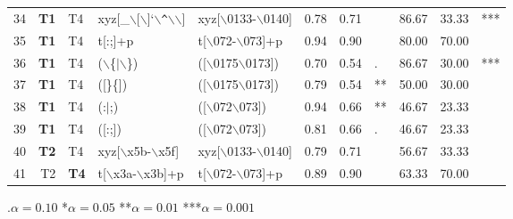 \begin{table*}[ht]
\begin{tabular}{rr@{ -- }lllrrlrrl}
  34 & {\bf T1} & T4 & xyz[\_$\backslash$[$\backslash$]`$\backslash$\verb|^|$\backslash$$\backslash$] & xyz[$\backslash$0133-$\backslash$0140] & 0.78 & 0.71 &   & 86.67 & 33.33 & *** \\ 

  35 & {\bf T1} & T4 & t[:;]+p & t[$\backslash$072-$\backslash$073]+p & 0.94 & 0.90 &   & 80.00 & 70.00 &   \\ 
  
  36 & {\bf T1} & T4 & ($\backslash$\{$|$$\backslash$\}) & ([$\backslash$0175$\backslash$0173]) & 0.70 & 0.54 & . & 86.67 & 30.00 & *** \\ 
  37 & {\bf T1} & T4 & ([\}\{]) & ([$\backslash$0175$\backslash$0173]) & 0.79 & 0.54 & ** & 50.00 & 30.00 &   \\ 
  38 & {\bf T1} & T4 & (:$|$;) & ([$\backslash$072$\backslash$073]) & 0.94 & 0.66 & ** & 46.67 & 23.33 &   \\ 
  39 & {\bf T1} & T4 & ([:;]) & ([$\backslash$072$\backslash$073]) & 0.81 & 0.66 & . & 46.67 & 23.33 &   \\ 
  
  40 & {\bf T2} & T4 & xyz[$\backslash$x5b-$\backslash$x5f] & xyz[$\backslash$0133-$\backslash$0140] & 0.79 & 0.71 &   & 56.67 & 33.33 &   \\ 
  41 & T2 & {\bf T4} & t[$\backslash$x3a-$\backslash$x3b]+p & t[$\backslash$072-$\backslash$073]+p & 0.89 & 0.90 &   & 63.33 & 70.00 &   \\ 
   \hline
\end{tabular}

.$\alpha = 0.10$ \hspace{3pt} *$\alpha=0.05$ \hspace{3pt} **$\alpha=0.01$ \hspace{3pt} ***$\alpha=0.001$
\end{table*}
